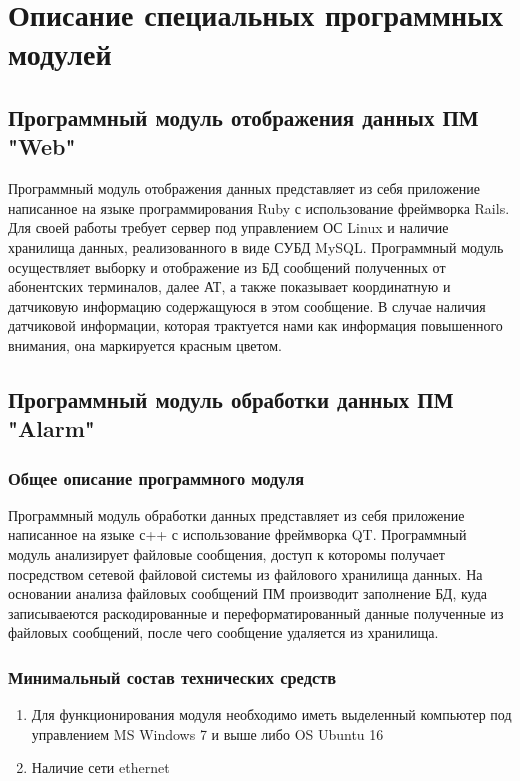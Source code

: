 \documentclass[12pt]{article}[a4paper,14pt,russian]
\begin{document}
	\section{Описание специальных программных модулей}	
	\subsection{Программный модуль отображения данных ПМ "Web"}

	Программный модуль отображения данных представляет из себя приложение написанное
	на языке программирования Ruby с использование фреймворка Rails. Для своей работы требует сервер под управлением ОС Linux и наличие хранилища данных, реализованного в виде СУБД MySQL. Программный модуль осуществляет выборку и отображение из БД  сообщений полученных от абонентских терминалов, далее АТ, а также показывает координатную и датчиковую информацию содержащуюся в этом сообщение. В случае наличия датчиковой информации, которая трактуется нами как информация повышенного внимания, она маркируется красным цветом.
	
	\subsection{Программный модуль обработки данных ПМ "Alarm"}
	\subsubsection{Общее описание программного модуля}
	Программный модуль обработки данных представляет из себя приложение написанное на
	языке с++ с использование фреймворка QT. Программный модуль анализирует файловые сообщения, доступ к которомы получает посредством сетевой файловой системы из файлового хранилища данных. На основании анализа файловых сообщений ПМ производит заполнение БД, куда записываеются раскодированные и переформатированный данные полученные из файловых сообщений, после чего сообщение удаляется из хранилища. 
	\subsubsection{Минимальный состав технических средств}
	\begin{enumerate}
	\item	Для функционирования модуля необходимо иметь выделенный компьютер под управлением
	MS Windows 7 и выше либо OS Ubuntu 16
	\item Наличие сети ethernet
	\end{enumerate}
\end{document}

